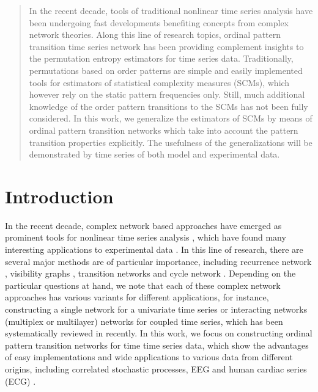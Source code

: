 \documentclass[12pt,aip,cha,reprint,nofootinbib]{revtex4-1}
\begin{document}
\maketitle

\begin{quotation}
In the recent decade, tools of traditional nonlinear time series analysis have been undergoing fast developments benefiting concepts from complex network theories. Along this line of research topics, ordinal pattern transition time series network has been providing complement insights to the permutation entropy estimators for time series data. Traditionally, permutations based on order patterns are simple and easily implemented tools for estimators of statistical complexity measures (SCMs), which however rely on the static pattern frequencies only. Still, much additional knowledge of the order pattern transitions to the SCMs has not been fully considered. In this work, we generalize the estimators of SCMs by means of ordinal pattern transition networks which take into account the pattern transition properties explicitly. The usefulness of the generalizations will be demonstrated by time series of both model and experimental data. 
\end{quotation}

\section{Introduction}
In the recent decade, complex network based approaches have emerged as prominent tools for nonlinear time series analysis \cite{Kantz97,Sprott2003}, which have found many interesting applications to experimental data \cite{ZouPR2018}. In this line of research, there are several major methods are of particular importance, including recurrence network \cite{MarwanPLA2009,Donner2010a}, visibility graphs \cite{Lacasa2008,Nunez2012}, transition networks \cite{Nicolis2005,MichaelChaos2015} and cycle network \cite{ZhangPRL2006}. Depending on the particular questions at hand, we note that each of these complex network approaches has various variants for different applications, for instance, constructing a single network for a univariate time series or interacting networks (multiplex or multilayer) networks for coupled time series, which has been systematically reviewed in \cite{ZouPR2018} recently. In this work, we focus on constructing ordinal pattern transition networks for time time series data, which show the advantages of easy implementations and wide applications to various data from different origins, including correlated stochastic processes, EEG and human cardiac series (ECG) \cite{MichaelChaos2015,KulpChaos2016,zhangSciRep2017,McCullough2017b,BorgesAMC2019}. 
\end{document}
